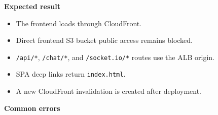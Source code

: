 \vspace{0.5em}\noindent\textbf{Expected result}\par

\begin{itemize}
\tightlist
\item
  The frontend loads through CloudFront.
\item
  Direct frontend S3 bucket public access remains blocked.
\item
  \texttt{/\allowbreak{}api/\allowbreak{}*}, \texttt{/\allowbreak{}chat/\allowbreak{}*}, and \texttt{/\allowbreak{}socket.\allowbreak{}io/\allowbreak{}*} routes
  use the ALB origin.
\item
  SPA deep links return \texttt{index.\allowbreak{}html}.
\item
  A new CloudFront invalidation is created after deployment.
\end{itemize}

\vspace{0.5em}\noindent\textbf{Common errors}\par

